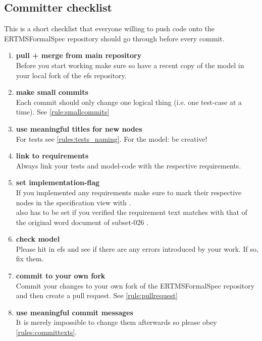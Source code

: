 \documentclass[draft]{efsguide}
\begin{document}
\begin{appendices}

\chapter{Committer checklist}
\label{appendix:committer_checklist}
This is a short checklist that everyone willing to push code onto the ERTMSFormalSpec repository should go through before every commit.

\begin{enumerate}
\item \textbf{pull + merge from main repository}\\
Before you start working make sure so have a recent copy of the model in your local fork of the \gls{efs} repository. 
\item \textbf{make small commits}\\
Each commit should only change one logical thing (i.e. one test-case at a time). See \ref{rule:smallcommits} 
\item \textbf{use meaningful titles for new nodes}\\
For tests see \ref{rules:tests_naming}. For the model: be creative! 
\item \textbf{link to requirements}\\
Always link your tests and model-code with the respective requirements. 
\item \textbf{set implementation-flag}\\
If you implemented any requirements make sure to mark their respective nodes in the specification view with .\\  also has to be set if you verified the requirement text matches with that of the original word document of subset-026 \cite{subset26}. 
\item \textbf{check model}\\
Please hit  in \gls{efs} and see if there are any errors introduced by your work. If so, fix them. 
\item \textbf{commit to your own fork}\\
Commit your changes to your own fork of the ERTMSFormalSpec repository and then create a pull request. See \ref{rule:pullrequest} 
\item \textbf{use meaningful commit messages}\\
It is merely impossible to change them afterwards so please obey \ref{rules:committexts}. 
\end{enumerate}

\end{appendices}



{}
\printglossary[style=listdotted]
\newpage

{}


\end{document}
